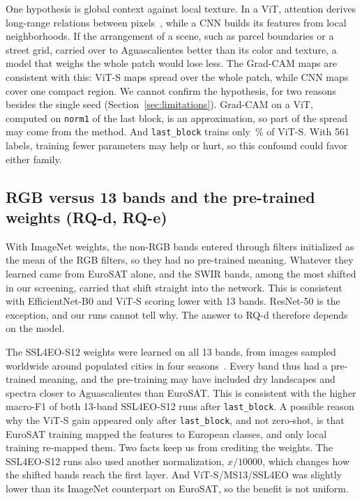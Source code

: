 One hypothesis is global context against local texture. In a ViT, attention derives long-range
relations between pixels~\cite{bazi2021vit}, while a CNN builds its features from local
neighborhoods. If the arrangement of a scene, such as
parcel boundaries or a street grid, carried over to Aguascalientes better than its color and
texture, a model that weighs the whole patch would lose less. The Grad-CAM maps are consistent
with this: ViT-S maps spread over the whole patch, while CNN maps cover one compact region. We
cannot confirm the hypothesis, for two reasons besides the single seed
(Section~\ref{sec:limitations}). Grad-CAM on a ViT, computed on \texttt{norm1} of the last
block, is an approximation, so part of the spread may come from the method. And
\texttt{last\_block} trains only \LastBlockShareViT\,\% of ViT-S. With 561 labels, training
fewer parameters may help or hurt, so this confound could favor either family.

\subsection{RGB versus 13 bands and the pre-trained weights (RQ-d, RQ-e)}

With ImageNet weights, the non-RGB bands entered through filters initialized as the mean of the
RGB filters, so they had no pre-trained meaning. Whatever they learned came from EuroSAT alone,
and the SWIR bands, among the most shifted in our screening, carried that shift straight into the
network. This is consistent with EfficientNet-B0 and ViT-S scoring lower with 13 bands.
ResNet-50 is the exception, and our runs cannot tell why. The answer to RQ-d therefore depends
on the model.

The SSL4EO-S12 weights were learned on all 13 bands, from images sampled worldwide around
populated cities in four seasons~\cite{wang2023ssl4eo}. Every band thus had a pre-trained
meaning, and the pre-training may have included dry landscapes and spectra closer to
Aguascalientes than EuroSAT. This is consistent with the higher macro-F1 of both 13-band
SSL4EO-S12 runs after \texttt{last\_block}. A possible reason why the ViT-S gain appeared only
after \texttt{last\_block}, and not zero-shot, is that EuroSAT training mapped the features to
European classes, and only local training re-mapped them. Two facts keep us from crediting the
weights. The SSL4EO-S12 runs also used another normalization, $x/\num{10000}$, which changes
how the shifted bands reach the first layer. And ViT-S/MS13/SSL4EO was slightly lower than its
ImageNet counterpart on EuroSAT, so the benefit is not uniform.


